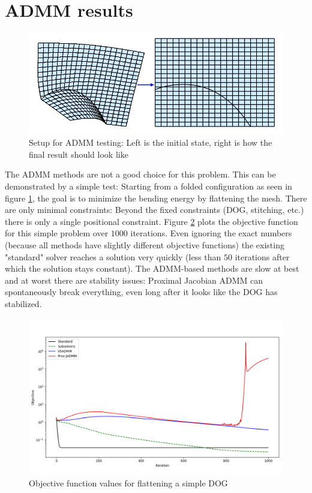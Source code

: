 \documentclass[a4paper,twoside,12pt,nochapterprefix]{scrbook}
\begin{document}
\section{ADMM results}
\begin{figure}
    \centering
    \includegraphics[width=0.6\linewidth]{figures/0311_howtoflatten}
    \caption{Setup for ADMM testing: Left is the initial state, right is how the final result should look like}
    \label{fig:admm_setup}
\end{figure}
The ADMM methods are not a good choice for this problem. This can be demonstrated by a simple test: Starting from a folded configuration as seen in figure \ref{fig:admm_setup}, the goal is to minimize the bending energy by flattening the mesh. There are only minimal constraints: Beyond the fixed constraints (DOG, stitching, etc.) there is only a single positional constraint.\newline
Figure \ref{fig:admm_results} plots the objective function for this simple problem over $1000$ iterations. Even ignoring the exact numbers (because all methods have slightly different objective functions) the existing "standard" solver reaches a solution very quickly (less than $50$ iterations after which the solution stays constant). The ADMM-based methods are slow at best and at worst there are stability issues: Proximal Jacobian ADMM can spontaneously break everything, even long after it looks like the DOG has stabilized.\newline
\begin{figure}
    \centering
    \includegraphics[width=0.99\linewidth]{figures/0221_flattenplot_from_1025}
    \caption{Objective function values for flattening a simple DOG}
    \label{fig:admm_results}
\end{figure}
\end{document}
